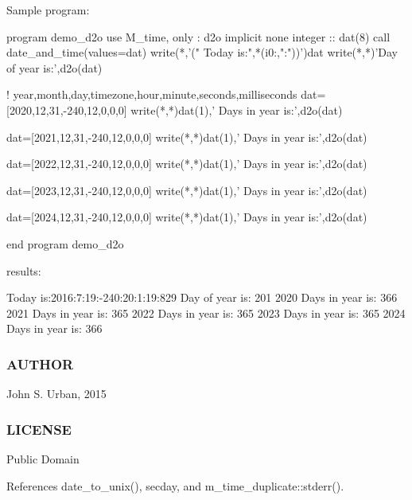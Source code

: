 \begin{DoxyVerb}Sample program:

 program demo_d2o
 use M_time, only : d2o
 implicit none
 integer :: dat(8)
    call date_and_time(values=dat)
    write(*,'(" Today is:",*(i0:,":"))')dat
    write(*,*)'Day of year is:',d2o(dat)

    ! year,month,day,timezone,hour,minute,seconds,milliseconds
    dat=[2020,12,31,-240,12,0,0,0]
    write(*,*)dat(1),' Days in year is:',d2o(dat)

    dat=[2021,12,31,-240,12,0,0,0]
    write(*,*)dat(1),' Days in year is:',d2o(dat)

    dat=[2022,12,31,-240,12,0,0,0]
    write(*,*)dat(1),' Days in year is:',d2o(dat)

    dat=[2023,12,31,-240,12,0,0,0]
    write(*,*)dat(1),' Days in year is:',d2o(dat)

    dat=[2024,12,31,-240,12,0,0,0]
    write(*,*)dat(1),' Days in year is:',d2o(dat)

 end program demo_d2o

results:

 Today is:2016:7:19:-240:20:1:19:829
 Day of year is:         201
        2020  Days in year is:         366
        2021  Days in year is:         365
        2022  Days in year is:         365
        2023  Days in year is:         365
        2024  Days in year is:         366
\end{DoxyVerb}


\subsubsection*{A\+U\+T\+H\+OR}

John S. Urban, 2015 \subsubsection*{L\+I\+C\+E\+N\+SE}

Public Domain 

References date\+\_\+to\+\_\+unix(), secday, and m\+\_\+time\+\_\+duplicate\+::stderr().

